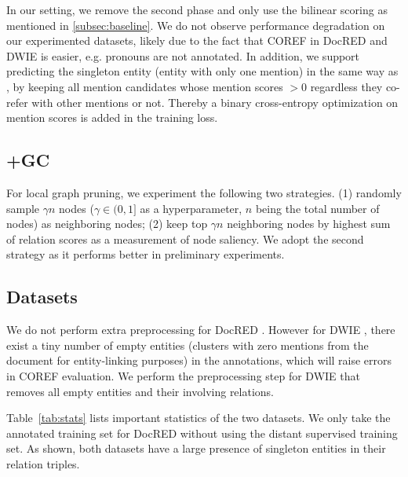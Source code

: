 \documentclass[11pt]{article}
\begin{document}
In our setting, we remove the second phase and only use the bilinear scoring as mentioned in \textsection\ref{subsec:baseline}. We do not observe performance degradation on our experimented datasets, likely due to the fact that COREF in DocRED and DWIE is easier, e.g. pronouns are not annotated. In addition, we support predicting the singleton entity (entity with only one mention) in the same way as \citet{crac}, by keeping all mention candidates whose mention scores $> 0$ regardless they co-refer with other mentions or not. Thereby a binary cross-entropy optimization on mention scores is added in the training loss.

\subsection{+GC}
\label{appd:gc}

For local graph pruning, we experiment the following two strategies. (1) randomly sample $\gamma n$ nodes ($\gamma \in (0, 1]$ as a hyperparameter, $n$ being the total number of nodes) as neighboring nodes; (2) keep top $\gamma n$ neighboring nodes by highest sum of relation scores as a measurement of node saliency. We adopt the second strategy as it performs better in preliminary experiments.

\subsection{Datasets}
\label{appd:datasets}

We do not perform extra preprocessing for DocRED \citep{docred}. However for DWIE \citep{dwie}, there exist a tiny number of empty entities (clusters with zero mentions from the document for entity-linking purposes) in the annotations, which will raise errors in COREF evaluation. We perform the preprocessing step for DWIE that removes all empty entities and their involving relations.

Table~\ref{tab:stats} lists important statistics of the two datasets. We only take the annotated training set for DocRED without using the distant supervised training set. As shown, both datasets have a large presence of singleton entities in their relation triples.
\end{document}
